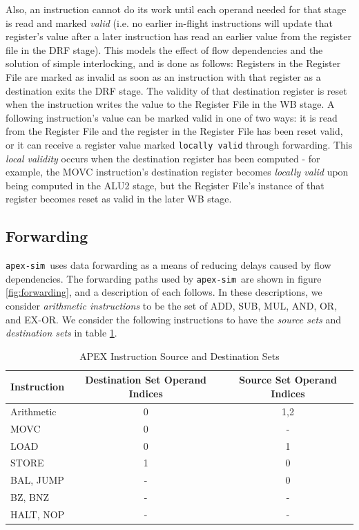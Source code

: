 \documentclass[12pt]{article}
\newcommand{\codename}[0]{\texttt{apex-sim}~}
\begin{document}
Also, an instruction cannot do its work until each operand needed for that stage is read and marked \textit{valid} (i.e. no earlier in-flight instructions will update that register's value after a later instruction has read an earlier value from the register file in the DRF stage).
This models the effect of flow dependencies and the solution of simple interlocking, and is done as follows:
Registers in the Register File are marked as invalid as soon as an instruction with that register as a destination exits the DRF stage. 
The validity of that destination register is reset when the instruction writes the value to the Register File in the WB stage.
A following instruction's value can be marked valid in one of two ways: it is read from the Register File and the register in the Register File has been reset valid, or it can receive a register value marked \texttt{locally valid} through forwarding. 
This \textit{local validity} occurs when the destination register has been computed - for example, the MOVC instruction's destination register becomes \textit{locally valid} upon being computed in the ALU2 stage, but the Register File's instance of that register becomes reset as valid in the later WB stage.

\subsection{Forwarding}
\label{sec:forwarding}
\codename uses data forwarding as a means of reducing delays caused by flow dependencies.
The forwarding paths used by \codename are shown in figure \ref{fig:forwarding}, and a description of each follows. In these descriptions, we consider \textit{arithmetic instructions} to be the set of ADD, SUB, MUL, AND, OR, and EX-OR. We consider the following instructions to have the \textit{source sets} and \textit{destination sets} in table \ref{tab:instsets}.

\begin{table}
  \centering
  \caption{APEX Instruction Source and Destination Sets}
  \label{tab:instsets}
  \begin{tabular}{l|c|c}
    Instruction & Destination Set Operand Indices & Source Set Operand Indices\\
    \hline
    Arithmetic					 	& 0 & 1,2\\
    MOVC 							& 0 & - \\
    LOAD							& 0 & 1 \\
    STORE							& 1 & 0 \\
    BAL, JUMP						& - & 0 \\
    BZ, BNZ 						& - & - \\ 
    HALT, NOP						& - & - \\
  \end{tabular}
\end{table}
\end{document}
